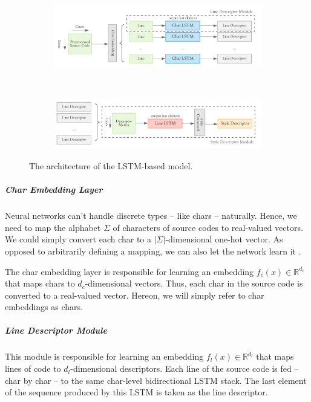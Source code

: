 \begin{figure}[htbp]
	\centering
	\begin{subfigure}[t]{\textwidth}
		\includegraphics[width=\linewidth]{imgs/lstm_char_level.pdf}
		\label{fig:lstm_architecture:a}
	\end{subfigure}%
	\\
	\begin{subfigure}[t]{\textwidth}
		\includegraphics[width=\linewidth]{imgs/lstm_line_level.pdf}
		\label{fig:lstm_architecture:b}
	\end{subfigure}%
	\caption{The architecture of the LSTM-based model.}
	\label{fig:lstm_architecture}
\end{figure}

\subparagraph*{Char Embedding Layer}

Neural networks can't handle discrete types -- like chars -- naturally. Hence, we need to map the alphabet $\Sigma$ of characters of source codes to real-valued vectors. We could simply convert each char to a $|\Sigma|$-dimensional one-hot vector. As opposed to arbitrarily defining a mapping, we can also let the network learn it \cite{keras_embedding}. 

The char embedding layer is responsible for learning an embedding $f_c(x) \in \mathbb{R}^{d_c}$ that maps chars to $d_c$-dimensional vectors. Thus, each char in the source code is converted to a real-valued vector. Hereon, we will simply refer to char embeddings as chars.

\subparagraph*{Line Descriptor Module} 

This module is responsible for learning an embedding $f_l(x) \in \mathbb{R}^{d_l}$ that maps lines of code to $d_l$-dimensional descriptors. Each line of the source code is fed -- char by char -- to the same char-level bidirectional LSTM stack. The last element of the sequence produced by this LSTM is taken as the line descriptor.

